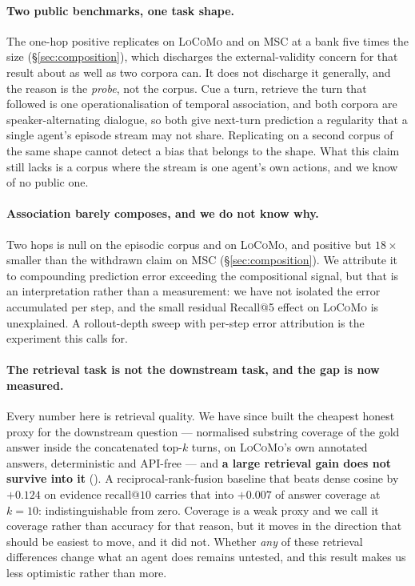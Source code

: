 \label{sec:limitations}

\paragraph{Two public benchmarks, one task shape.} The one-hop positive replicates on
\textsc{LoCoMo} \citep{maharana2024locomo} and on \textsc{MSC} \citep{xu2022msc} at a bank
five times the size (\S\ref{sec:composition}), which discharges the external-validity concern
for that result about as well as two corpora can. It does not discharge it generally, and
the reason is the \emph{probe}, not the corpus. Cue a turn, retrieve the turn that followed
is one operationalisation of temporal association, and both corpora are
speaker-alternating dialogue, so both give next-turn prediction a regularity that a single
agent's episode stream may not share. Replicating on a second corpus of the same shape
cannot detect a bias that belongs to the shape. What this claim still lacks is a corpus
where the stream is one agent's own actions, and we know of no public one.

\paragraph{Association barely composes, and we do not know why.} Two hops is null on the
episodic corpus and on \textsc{LoCoMo}, and positive but $18\times$ smaller than the
withdrawn claim on \textsc{MSC} (\S\ref{sec:composition}). We attribute it to compounding prediction error
exceeding the compositional signal, but that is an interpretation rather than a measurement:
we have not isolated the error accumulated per step, and the small residual Recall@5 effect
on \textsc{LoCoMo} is unexplained. A rollout-depth sweep with per-step error attribution is
the experiment this calls for.

\paragraph{The retrieval task is not the downstream task, and the gap is now measured.}
Every number here is retrieval quality. We have since built the cheapest honest proxy for
the downstream question --- normalised substring coverage of the gold answer inside the
concatenated top-$k$ turns, on \textsc{LoCoMo}'s own annotated answers, deterministic and
API-free --- and \textbf{a large retrieval gain does not survive into it} (). A
reciprocal-rank-fusion baseline that beats dense cosine by $+0.124$ on evidence
$\mathrm{recall}@10$ carries that into $+0.007$  of answer coverage at
$k{=}10$: indistinguishable from zero. Coverage is a weak proxy and we call it coverage
rather than accuracy for that reason, but it moves in the direction that should be easiest
to move, and it did not. Whether \emph{any} of these retrieval differences change what an
agent does remains untested, and this result makes us less optimistic rather than more.

